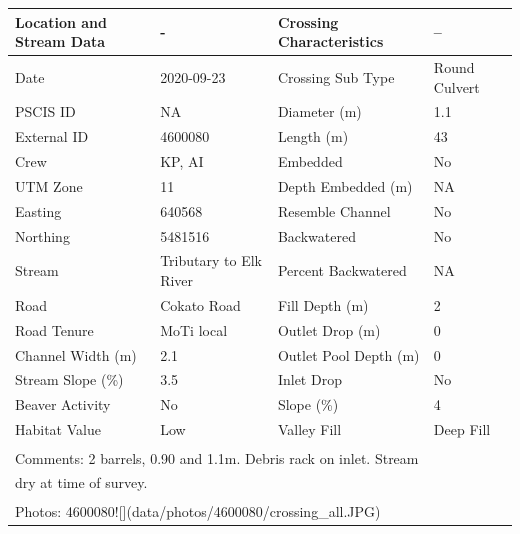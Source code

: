 \documentclass[
]{book}
\begin{document}
\begin{tabular}{llll}
\toprule
Location and Stream Data & - & Crossing Characteristics & --\\
\midrule
Date & 2020-09-23 & Crossing Sub Type & Round Culvert\\
PSCIS ID & NA & Diameter (m) & 1.1\\
External ID & 4600080 & Length (m) & 43\\
Crew & KP, AI & Embedded & No\\
UTM Zone & 11 & Depth Embedded (m) & NA\\
\addlinespace
Easting & 640568 & Resemble Channel & No\\
Northing & 5481516 & Backwatered & No\\
Stream & Tributary to Elk River & Percent Backwatered & NA\\
Road & Cokato Road & Fill Depth (m) & 2\\
Road Tenure & MoTi local & Outlet Drop (m) & 0\\
\addlinespace
Channel Width (m) & 2.1 & Outlet Pool Depth (m) & 0\\
Stream Slope (\%) & 3.5 & Inlet Drop & No\\
Beaver Activity & No & Slope (\%) & 4\\
Habitat Value & Low & Valley Fill & Deep Fill\\
\bottomrule
\multicolumn{4}{l}{\textsuperscript{} Comments: 2 barrels, 0.90 and 1.1m. Debris rack on inlet. Stream}\\
\multicolumn{4}{l}{dry at time of survey.}\\
\multicolumn{4}{l}{\textsuperscript{} Photos: 4600080![](data/photos/4600080/crossing\_all.JPG)}\\
\end{tabular}
\end{document}
